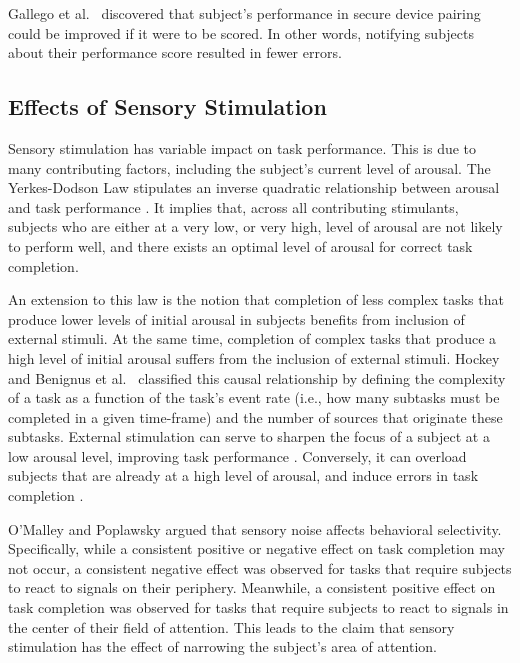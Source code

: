 \documentclass{llncs}
\begin{document}
Gallego et al.~\cite{sadeghi_exploring_2013} discovered that subject's performance 
in secure device pairing could be improved if it were to be scored. In other words, 
notifying subjects about their performance score resulted in fewer errors.

\subsection{Effects of Sensory Stimulation}
%

Sensory stimulation has variable impact on task performance. This is due to many contributing factors, 
including the subject's current level of arousal. The Yerkes-Dodson Law stipulates an inverse 
quadratic relationship between arousal and task performance \cite{cohen_yerkesdodson_2011}. It implies
that, across all contributing stimulants, subjects who are either at a very low, or very high, level of arousal 
are not likely to perform well, and there exists an optimal level of arousal for correct task completion. 

An extension to this law is the notion that completion of less complex tasks that produce lower levels of 
initial arousal in subjects benefits from inclusion of external stimuli. At the same time, 
completion of complex tasks 
that produce a high level of initial arousal suffers from the inclusion of external stimuli. 
Hockey \cite{hockey_effect_1970} and Benignus et al.~\cite{benignus_effect_1975} classified this 
causal relationship by defining the complexity of a task as a function of the task's event rate 
(i.e., how many subtasks must be completed in a given time-frame) and the number of sources 
that originate 
these subtasks. External stimulation can serve to sharpen the focus of a subject at a low arousal level, 
improving task performance \cite{olmedo_maintenance_1977}. Conversely, it can overload subjects 
that are already at a high level of arousal, and induce errors in task completion \cite{harris_stress_1960}.

O'Malley and Poplawsky \cite{omalley_noise-induced_1971} argued that sensory noise affects 
behavioral selectivity. Specifically, while a consistent positive or negative effect on task completion 
may not occur, a consistent negative effect was observed for tasks that require subjects to react to 
signals on their periphery. Meanwhile, a consistent positive effect on task completion was observed 
for tasks that require subjects to react to signals in the center of their field of attention. This leads to the claim that sensory stimulation has the effect of narrowing the subject's area of attention.
\end{document}
